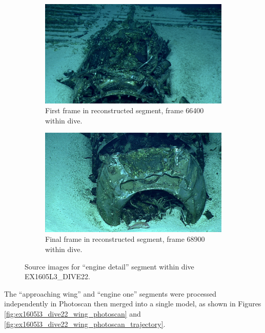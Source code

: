\documentclass[letterpaper,12pt]{article}
\begin{document}
\begin{figure}
    \centering
    \begin{subfigure}[b]{0.48\textwidth}
        \includegraphics[width=\textwidth]{images/image_066400.png}
        \caption{First frame in reconstructed segment, frame 66400 within dive.}
        \label{fig:ex1605l3_dive22_engine_one_begin}
    \end{subfigure}
    \begin{subfigure}[b]{0.48\textwidth}
        \includegraphics[width=\textwidth]{images/image_068900.png}
        \caption{Final frame in reconstructed segment, frame 68900 within dive.}
        \label{fig:ex1605l3_dive22_engine_one_end}
    \end{subfigure}
    \caption{Source images for ``engine detail'' segment within dive EX1605L3\_DIVE22.}
\end{figure}

The ``approaching wing'' and ``engine one'' segments were processed independently in Photoscan then merged into a single model, as shown in Figures \ref{fig:ex1605l3_dive22_wing_photoscan} and \ref{fig:ex1605l3_dive22_wing_photoscan_trajectory}. 
\end{document}
